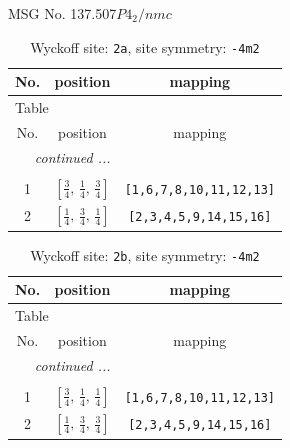 \documentclass[fleqn,8pt]{jsarticle}
\begin{document}
\setcounter{MaxMatrixCols}{32}

\renewcommand{\tablename}{Table~}
\renewcommand{\figurename}{Figure~}
\begin{center}
\LARGE
MSG No. 137.507\quad$P4_{2}/nmc$
\end{center}
\renewcommand{\arraystretch}{1.2}
\begin{longtable}{ccc}
\caption{Wyckoff site: {\tt 2a}, site symmetry: {\tt -4m2}}
 \\
 \hline \hline
No. & position & mapping \\ \hline \endfirsthead

\multicolumn{2}{l}{\tablename\ \thetable{}} \\
 \hline \hline
No. & position & mapping \\ \hline \endhead

 \hline \hline
\multicolumn{2}{r}{\footnotesize\it continued ...} \\ \endfoot

 \hline \hline
\multicolumn{2}{r}{} \\ \endlastfoot

1 & $\left[ \frac{3}{4},\, \frac{1}{4},\, \frac{3}{4} \right]$ & {\tt [1,6,7,8,10,11,12,13]} \\ \hline
2 & $\left[ \frac{1}{4},\, \frac{3}{4},\, \frac{1}{4} \right]$ & {\tt [2,3,4,5,9,14,15,16]} \\
\end{longtable}
\renewcommand{\arraystretch}{1.2}
\begin{longtable}{ccc}
\caption{Wyckoff site: {\tt 2b}, site symmetry: {\tt -4m2}}
 \\
 \hline \hline
No. & position & mapping \\ \hline \endfirsthead

\multicolumn{2}{l}{\tablename\ \thetable{}} \\
 \hline \hline
No. & position & mapping \\ \hline \endhead

 \hline \hline
\multicolumn{2}{r}{\footnotesize\it continued ...} \\ \endfoot

 \hline \hline
\multicolumn{2}{r}{} \\ \endlastfoot

1 & $\left[ \frac{3}{4},\, \frac{1}{4},\, \frac{1}{4} \right]$ & {\tt [1,6,7,8,10,11,12,13]} \\ \hline
2 & $\left[ \frac{1}{4},\, \frac{3}{4},\, \frac{3}{4} \right]$ & {\tt [2,3,4,5,9,14,15,16]} \\
\end{longtable}
\end{document}
